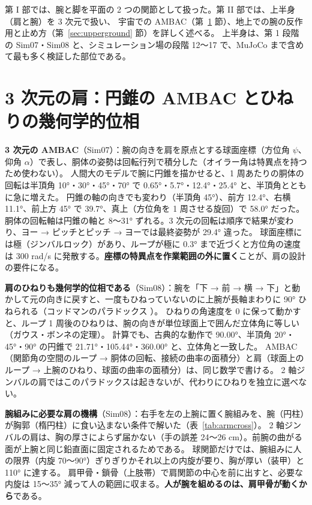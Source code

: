 \documentclass[paper=a4paper,fontsize=10pt,twocolumn,column_gap=2zw,line_length=24zw,number_of_lines=46,head_space=20mm]{jlreq}
\begin{document}
第 I 部では、腕と脚を平面の 2 つの関節として扱った。第 II 部では、上半身（肩と腕）を 3 次元で扱い、
宇宙での AMBAC（第~\ref{sec:upper3d} 節）、地上での腕の反作用と止め方（第~\ref{sec:upperground} 節）を詳しく述べる。
上半身は、第 1 段階の Sim07・Sim08 と、シミュレーション場の段階 12〜17 で、MuJoCo まで含めて最も多く検証した部位である。

\section{3 次元の肩：円錐の AMBAC とひねりの幾何学的位相}\label{sec:upper3d}

\textbf{3 次元の AMBAC}（Sim07）：腕の向きを肩を原点とする球面座標（方位角 $\psi$、仰角 $\alpha$）で表し、胴体の姿勢は回転行列で積分した（オイラー角は特異点を持つため使わない）。
人間大のモデルで腕に円錐を描かせると、1 周あたりの胴体の回転は半頂角 10°・30°・45°・70° で 0.65°・5.7°・12.4°・25.4° と、半頂角とともに急に増えた。
円錐の軸の向きでも変わり（半頂角 45°）、前方 12.4°、右横 11.1°、前上方 45° で 39.7°、真上（方位角を 1 周させる旋回）で 58.0° だった。
胴体の回転軸は円錐の軸と 8〜31° ずれる。3 次元の回転は順序で結果が変わり、ヨー → ピッチとピッチ → ヨーでは最終姿勢が 29.4° 違った。
球面座標には極（ジンバルロック）があり、ループが極に 0.3° まで近づくと方位角の速度は 300 rad/s に発散する。\textbf{座標の特異点を作業範囲の外に置く}ことが、肩の設計の要件になる。

\textbf{肩のひねりも幾何学的位相である}（Sim08）：腕を「下 → 前 → 横 → 下」と動かして元の向きに戻すと、一度もひねっていないのに上腕が長軸まわりに 90° ひねられる（コッドマンのパラドックス \cite{codman1934}）。
ひねりの角速度を 0 に保って動かすと、ループ 1 周後のひねりは、腕の向きが単位球面上で囲んだ立体角に等しい（ガウス・ボンネの定理）。
計算でも、古典的な動作で 90.00°、半頂角 20°・45°・90° の円錐で 21.71°・105.44°・360.00° と、立体角と一致した。
AMBAC（関節角の空間のループ → 胴体の回転、接続の曲率の面積分）と肩（球面上のループ → 上腕のひねり、球面の曲率の面積分）は、同じ数学で書ける。
2 軸ジンバルの肩ではこのパラドックスは起きないが、代わりにひねりを独立に選べない。

\textbf{腕組みに必要な肩の機構}（Sim08）：右手を左の上腕に置く腕組みを、腕（円柱）が胸郭（楕円柱）に食い込まない条件で解いた（表~\ref{tab:armcross}）。
2 軸ジンバルの肩は、胸の厚さによらず届かない（手の誤差 24〜26 cm）。前腕の曲がる面が上腕と同じ鉛直面に固定されるためである。
球関節だけでは、腕組みに人の限界（内旋 70〜90°）ぎりぎりかそれ以上の内旋が要り、胸が厚い（装甲）と 110° に達する。
肩甲骨・鎖骨（上肢帯）で肩関節の中心を前に出すと、必要な内旋は 15〜35° 減って人の範囲に収まる。\textbf{人が腕を組めるのは、肩甲骨が動くから}である。
\end{document}
